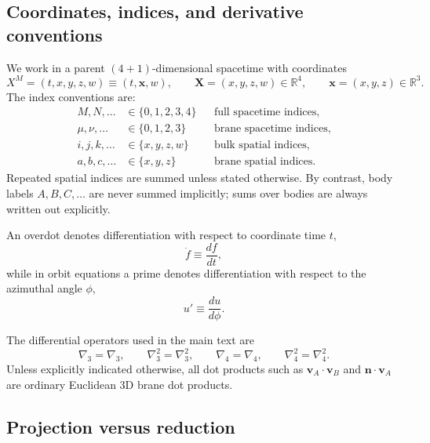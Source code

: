 \documentclass[11pt]{article}
\newcommand{\R}{\mathbb R}
\newcommand{\X}{\mathbf X}
\newcommand{\x}{\mathbf x}
\newcommand{\vct}{\mathbf v}
\newcommand{\nvec}{\mathbf n}
\newcommand{\gradThree}{\nabla_3}
\newcommand{\gradFour}{\nabla_4}
\newcommand{\lapThree}{\nabla_3^2}
\newcommand{\lapFour}{\nabla_4^2}
\begin{document}
\subsection{Coordinates, indices, and derivative conventions}
\label{app:notation-indices}

We work in a parent \((4+1)\)-dimensional spacetime with coordinates
\begin{equation}
X^M=(t,x,y,z,w)\equiv (t,\x,w),
\qquad
\X=(x,y,z,w)\in\R^4,
\qquad
\x=(x,y,z)\in\R^3.
\label{eq:notation-coordinates}
\end{equation}
The index conventions are:
\begin{align}
M,N,\dots &\in \{0,1,2,3,4\}
&& \text{full spacetime indices}, \nonumber\\
\mu,\nu,\dots &\in \{0,1,2,3\}
&& \text{brane spacetime indices}, \nonumber\\
i,j,k,\dots &\in \{x,y,z,w\}
&& \text{bulk spatial indices}, \nonumber\\
a,b,c,\dots &\in \{x,y,z\}
&& \text{brane spatial indices}.
\label{eq:notation-index-ranges}
\end{align}
Repeated spatial indices are summed unless stated otherwise. By contrast, body labels
\(A,B,C,\dots\) are never summed implicitly; sums over bodies are always written out
explicitly.

An overdot denotes differentiation with respect to coordinate time \(t\),
\begin{equation}
\dot f \equiv \frac{df}{dt},
\end{equation}
while in orbit equations a prime denotes differentiation with respect to the azimuthal
angle \(\phi\),
\begin{equation}
u' \equiv \frac{du}{d\phi}.
\end{equation}

The differential operators used in the main text are
\begin{equation}
\gradThree=\nabla_3,
\qquad
\lapThree=\nabla_3^2,
\qquad
\gradFour=\nabla_4,
\qquad
\lapFour=\nabla_4^2.
\label{eq:notation-gradients}
\end{equation}
Unless explicitly indicated otherwise, all dot products such as
\(\vct_A\!\cdot\!\vct_B\) and \(\nvec\!\cdot\!\vct_A\) are ordinary Euclidean 3D brane
dot products.

\subsection{Projection versus reduction}
\label{app:notation-projection}
\end{document}

